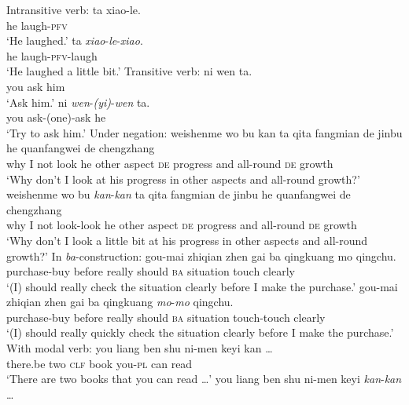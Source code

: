 \settowidth{}

\ea\label{ex:redup-syn}
	\ea Intransitive verb:
		\ea \gll ta xiao-le.\\
		he laugh-\textsc{pfv}\\
		\glt `He laughed.'
		\ex \gll ta \textit{xiao}-\textit{le}-\textit{xiao}.\\
		he laugh-\textsc{pfv}-laugh\\
		\glt `He laughed a little bit.'
		\z
	\ex Transitive verb:
		\ea \gll ni wen ta.\\
		you ask him\\
		\glt `Ask him.'
		\ex \gll ni \textit{wen}-\textit{(yi)}-\textit{wen} ta.\\
		you ask-(one)-ask he\\
		\glt `Try to ask him.'
		\z
	\ex Under negation:
		\ea \gll weishenme wo bu kan ta qita fangmian de jinbu he quanfangwei de chengzhang\\
		why I not look he other aspect \textsc{de} progress and all-round \textsc{de} growth\\
		\glt `Why don't I look at his progress in other aspects and all-round growth?'
		\ex \gll weishenme wo bu \textit{kan}-\textit{kan} ta qita fangmian de jinbu he quanfangwei de chengzhang\\
		why I not look-look he other aspect \textsc{de} progress and all-round \textsc{de} growth\\ 
		\glt `Why don't I look a little bit at his progress in other aspects and all-round growth?'
		\z
	\ex In \textit{ba}-construction:
		\ea \gll gou-mai zhiqian zhen gai ba qingkuang mo qingchu.\\
		purchase-buy before really should \textsc{ba} situation touch clearly\\
		\glt `(I) should really check the situation clearly before I make the purchase.'
		\ex \gll gou-mai zhiqian zhen gai ba qingkuang \textit{mo}-\textit{mo} qingchu.\\
		purchase-buy before really should \textsc{ba} situation touch-touch clearly\\ 
		\glt `(I) should really quickly check the situation clearly before I make the purchase.'
		\z
	\ex With modal verb:
		\ea \gll you liang ben shu ni-men keyi kan \ldots\\
		there.be two \textsc{clf} book you-\textsc{pl} can read\\
		\glt `There are two books that you can read \ldots'
		\ex \gll you liang ben shu ni-men keyi \textit{kan}-\textit{kan} \ldots\\
